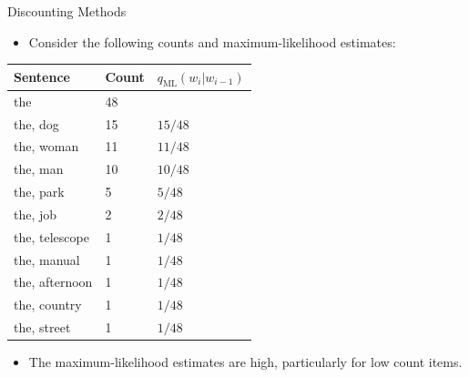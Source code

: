 \documentclass[10pt]{beamer}
\begin{document}
\begin{frame}{Discounting Methods}
\begin{scriptsize}
\begin{itemize}
\item Consider the following counts and maximum-likelihood estimates:
\end{itemize}

\begin{table}[h]
    \centering
    \begin{tabular}{lll}
        \textbf{Sentence} & \textbf{Count} & \textbf{$q_{\text{ML}}(w_i | w_{i-1})$} \\
        \hline
        the & 48 & \\
        the, dog & 15 & $15/48$ \\
        the, woman & 11 & $11/48$ \\
        the, man & 10 & $10/48$ \\
        the, park & 5 & $5/48$ \\
        the, job & 2 & $2/48$ \\
        the, telescope & 1 & $1/48$ \\
        the, manual & 1 & $1/48$ \\
        the, afternoon & 1 & $1/48$ \\
        the, country & 1 & $1/48$ \\
        the, street & 1 & $1/48$ \\
    \end{tabular}
\end{table}

\begin{itemize}
    \item The maximum-likelihood estimates are high, particularly for low count items.
\end{itemize}
\end{scriptsize}
\end{frame}
\end{document}
